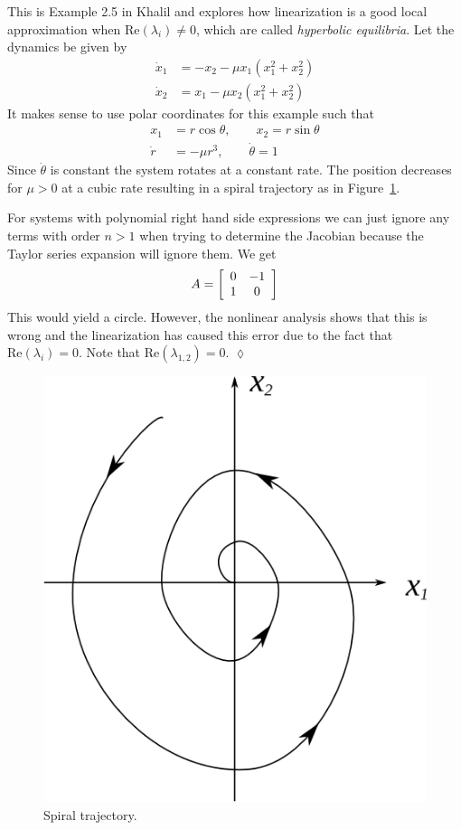 \begin{example}
This is Example 2.5 in Khalil and explores how linearization is a good local approximation when $\text{Re} (\lambda_i)\neq0$, which are called \textit{hyperbolic equilibria}. Let the dynamics be given by
\begin{align*}
\dot{x}_1 &= -x_2 - \mu x_1(x_1^2 + x_2^2) \\
\dot{x}_2 &= x_1 - \mu x_2(x_1^2 + x_2^2)
\end{align*}
It makes sense to use polar coordinates for this example such that
\begin{align*}
x_1 &= r\cos\theta, \qquad x_2 = r\sin\theta \\
\dot{r} &= -\mu r^3, \qquad \dot{\theta} = 1
\end{align*}
Since $\dot{\theta}$ is constant the system rotates at a constant rate. The position decreases for $\mu>0$ at a cubic rate resulting in a spiral trajectory as in Figure~\ref{fig:03cubic}.

For systems with polynomial right hand side expressions we can just ignore any terms with order $n>1$ when trying to determine the Jacobian because the Taylor series expansion will ignore them. We get
$$A = \left[\begin{array}{c c} 0 & -1 \\ 1 & 0 \end{array}\right]$$
This would yield a circle. However, the nonlinear analysis shows that this is wrong and the linearization has caused this error due to the fact that $\text{Re} (\lambda_i) = 0$. Note that $\text{Re} (\lambda_{1,2}) = 0$.
$\lozenge$
\end{example}

\begin{figure}[ht!]
	\centering
	\includegraphics[width=.5\textwidth]{images/03cubic}
	\caption{Spiral trajectory.}
	\label{fig:03cubic}
\end{figure}

